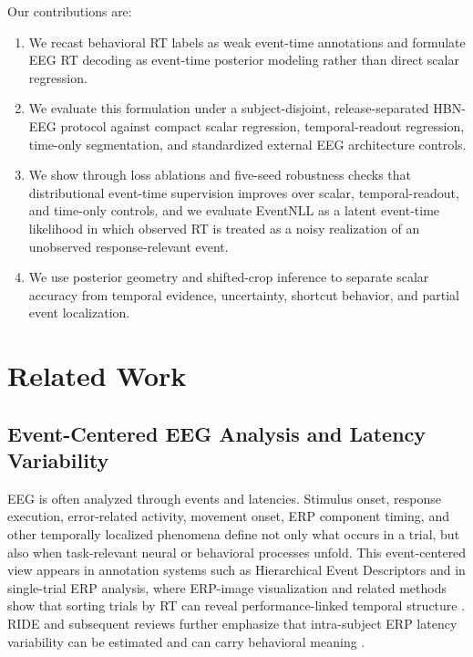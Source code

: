 \documentclass[12pt]{article}
\begin{document}
Our contributions are:
\begin{enumerate}
    \item We recast behavioral RT labels as weak event-time annotations and formulate EEG RT decoding as event-time posterior modeling rather than direct scalar regression.
    \item We evaluate this formulation under a subject-disjoint, release-separated HBN-EEG protocol against compact scalar regression, temporal-readout regression, time-only segmentation, and standardized external EEG architecture controls.
    \item We show through loss ablations and five-seed robustness checks that distributional event-time supervision improves over scalar, temporal-readout, and time-only controls, and we evaluate EventNLL as a latent event-time likelihood in which observed RT is treated as a noisy realization of an unobserved response-relevant event.
    \item We use posterior geometry and shifted-crop inference to separate scalar accuracy from temporal evidence, uncertainty, shortcut behavior, and partial event localization.
\end{enumerate}

\section{Related Work}

\subsection{Event-Centered EEG Analysis and Latency Variability}
EEG is often analyzed through events and latencies. Stimulus onset, response execution, error-related activity, movement onset, ERP component timing, and other temporally localized phenomena define not only what occurs in a trial, but also when task-relevant neural or behavioral processes unfold. This event-centered view appears in annotation systems such as Hierarchical Event Descriptors \citep{BigdelyShamlo2016HED} and in single-trial ERP analysis, where ERP-image visualization and related methods show that sorting trials by RT can reveal performance-linked temporal structure \citep{Jung1998SingleTrialERP}. RIDE and subsequent reviews further emphasize that intra-subject ERP latency variability can be estimated and can carry behavioral meaning \citep{Ouyang2011RIDE,Ouyang2017LatencyReview}.
\end{document}
